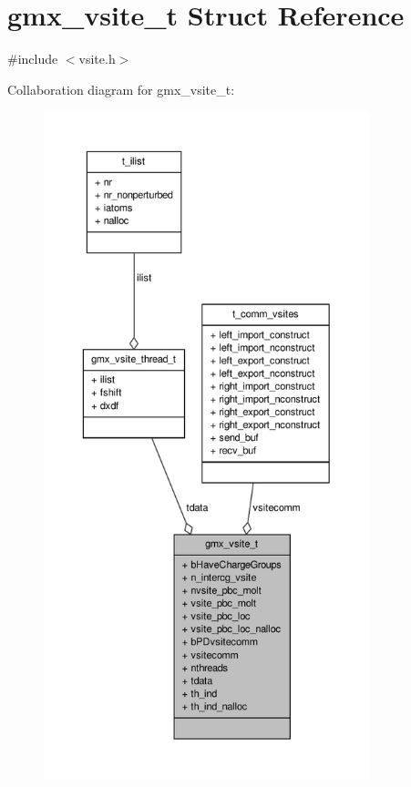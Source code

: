 \hypertarget{structgmx__vsite__t}{\section{gmx\-\_\-vsite\-\_\-t \-Struct \-Reference}
\label{structgmx__vsite__t}
}


{\ttfamily \#include $<$vsite.\-h$>$}



\-Collaboration diagram for gmx\-\_\-vsite\-\_\-t\-:
\nopagebreak
\begin{figure}[H]
\begin{center}
\leavevmode
\includegraphics[height=550pt]{structgmx__vsite__t__coll__graph}
\end{center}
\end{figure}
